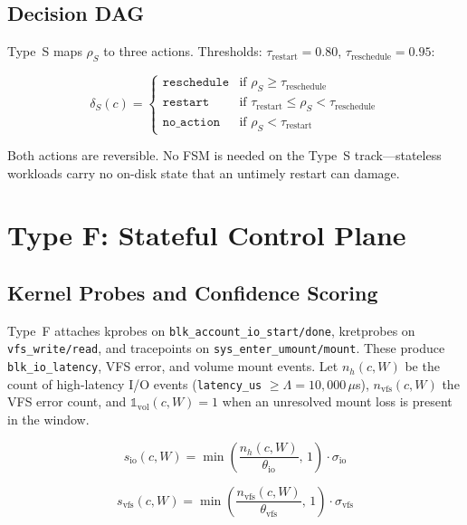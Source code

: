 \documentclass[conference]{IEEEtran}
\begin{document}
\subsection{Decision DAG}

Type~S maps $\rho_S$ to three actions. Thresholds: $\tau_{\mathrm{restart}} = 0.80$, $\tau_{\mathrm{reschedule}} = 0.95$:

\begin{equation*}
\delta_S(c) =
\begin{cases}
\texttt{reschedule} & \text{if } \rho_S \geq \tau_{\mathrm{reschedule}} \\
\texttt{restart}    & \text{if } \tau_{\mathrm{restart}} \leq \rho_S < \tau_{\mathrm{reschedule}} \\
\texttt{no\_action} & \text{if } \rho_S < \tau_{\mathrm{restart}}
\end{cases}
\end{equation*}

Both actions are reversible. No FSM is needed on the Type~S track---stateless workloads carry no on-disk state that an untimely restart can damage.

\section{Type F: Stateful Control Plane}
\label{sec:typef}

\subsection{Kernel Probes and Confidence Scoring}

Type~F attaches kprobes on \texttt{blk\_account\_io\_start/done}, kretprobes on \texttt{vfs\_write/read}, and tracepoints on \texttt{sys\_enter\_umount/mount}. These produce \texttt{blk\_io\_latency}, VFS error, and volume mount events. Let $n_h(c, W)$ be the count of high-latency I/O events (\texttt{latency\_us} $\geq \Lambda = 10{,}000\,\mu$s), $n_{\mathrm{vfs}}(c, W)$ the VFS error count, and $\mathbb{1}_{\mathrm{vol}}(c, W) = 1$ when an unresolved mount loss is present in the window.

\begin{equation}
s_{\mathrm{io}}(c, W) = \min\!\left(\frac{n_h(c, W)}{\theta_{\mathrm{io}}},\, 1\right) \cdot \sigma_{\mathrm{io}}
\label{eq:sio}
\end{equation}

\begin{equation}
s_{\mathrm{vfs}}(c, W) = \min\!\left(\frac{n_{\mathrm{vfs}}(c, W)}{\theta_{\mathrm{vfs}}},\, 1\right) \cdot \sigma_{\mathrm{vfs}}
\label{eq:svfs}
\end{equation}
\end{document}

